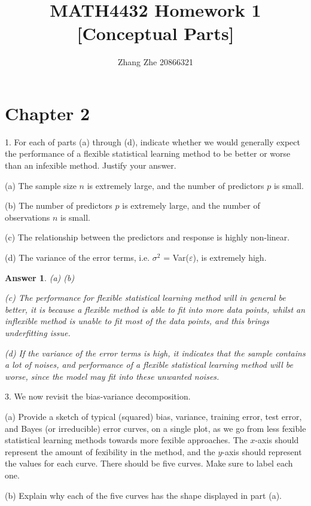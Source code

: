 \documentclass{article}
\title{MATH4432 Homework 1 [Conceptual Parts]}
\author{Zhang Zhe 20866321}
\theoremstyle{MyNonumberplain}
\theoremstyle{break}
\theoremstyle{break}
\newtheorem*{answer}{Answer}
\theoremstyle{break}
\theoremstyle{break}
\begin{document}
\maketitle

\newpage

\section*{Chapter 2}

1. For each of parts (a) through (d), indicate whether we would generally
expect the performance of a flexible statistical learning method to be
better or worse than an infexible method. Justify your answer.

(a) The sample size $n$ is extremely large, and the number of predictors $p$ is small.

(b) The number of predictors $p$ is extremely large, and the number
of observations $n$ is small.

(c) The relationship between the predictors and response is highly
non-linear.

(d) The variance of the error terms, i.e. $\sigma^2$ = Var($\varepsilon$), is extremely
high.

\begin{prfbox}
    \begin{answer}  
        (a) 
        \bigskip
        (b)

        \bigskip

        (c) The performance for flexible statistical learning method will in general be better, 
        it is because a flexible method is able to fit into more data points, whilst an inflexible method
        is unable to fit most of the data points, and this brings underfitting issue.

        \bigskip

        (d) If the variance of the error terms is high, it indicates that the sample contains a lot of noises,
        and performance of a flexible statistical learning method will be worse, since the model may fit into these
        unwanted noises.
    \end{answer} 
\end{prfbox}


3. We now revisit the bias-variance decomposition.

(a) Provide a sketch of typical (squared) bias, variance, training error, test error, and Bayes (or irreducible) error curves, on a single plot, as we go from less fexible statistical learning methods
towards more fexible approaches. The $x$-axis should represent
the amount of fexibility in the method, and the $y$-axis should
represent the values for each curve. There should be five curves.
Make sure to label each one.

(b) Explain why each of the five curves has the shape displayed in
part (a).
\end{document}

